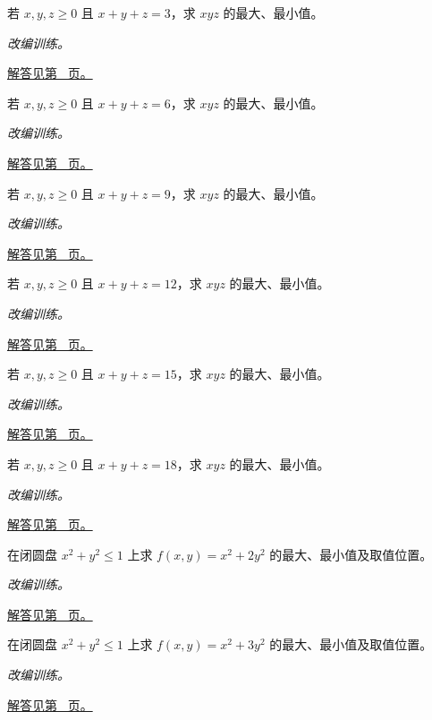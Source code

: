 \documentclass[UTF8,12pt,a4paper,fontset=fandol]{ctexart}
\begin{document}
\begin{example}[正数定和时的三元乘积]\label{ex:c35q7}
若 $x,y,z\ge0$ 且 $x+y+z=3$，求 $xyz$ 的最大、最小值。
\par\textit{改编训练。}\par\hyperref[ans:c35q7]{解答见第~\pageref{ans:c35q7} 页。}
\end{example}
\begin{example}[正数定和时的三元乘积]\label{ex:c35q8}
若 $x,y,z\ge0$ 且 $x+y+z=6$，求 $xyz$ 的最大、最小值。
\par\textit{改编训练。}\par\hyperref[ans:c35q8]{解答见第~\pageref{ans:c35q8} 页。}
\end{example}
\begin{example}[正数定和时的三元乘积]\label{ex:c35q9}
若 $x,y,z\ge0$ 且 $x+y+z=9$，求 $xyz$ 的最大、最小值。
\par\textit{改编训练。}\par\hyperref[ans:c35q9]{解答见第~\pageref{ans:c35q9} 页。}
\end{example}
\begin{example}[正数定和时的三元乘积]\label{ex:c35q10}
若 $x,y,z\ge0$ 且 $x+y+z=12$，求 $xyz$ 的最大、最小值。
\par\textit{改编训练。}\par\hyperref[ans:c35q10]{解答见第~\pageref{ans:c35q10} 页。}
\end{example}
\begin{example}[正数定和时的三元乘积]\label{ex:c35q11}
若 $x,y,z\ge0$ 且 $x+y+z=15$，求 $xyz$ 的最大、最小值。
\par\textit{改编训练。}\par\hyperref[ans:c35q11]{解答见第~\pageref{ans:c35q11} 页。}
\end{example}
\begin{example}[正数定和时的三元乘积]\label{ex:c35q12}
若 $x,y,z\ge0$ 且 $x+y+z=18$，求 $xyz$ 的最大、最小值。
\par\textit{改编训练。}\par\hyperref[ans:c35q12]{解答见第~\pageref{ans:c35q12} 页。}
\end{example}
\begin{example}[圆盘上的二次型]\label{ex:c35q13}
在闭圆盘 $x^2+y^2\le1$ 上求 $f(x,y)=x^2+2y^2$ 的最大、最小值及取值位置。
\par\textit{改编训练。}\par\hyperref[ans:c35q13]{解答见第~\pageref{ans:c35q13} 页。}
\end{example}
\begin{example}[圆盘上的二次型]\label{ex:c35q14}
在闭圆盘 $x^2+y^2\le1$ 上求 $f(x,y)=x^2+3y^2$ 的最大、最小值及取值位置。
\par\textit{改编训练。}\par\hyperref[ans:c35q14]{解答见第~\pageref{ans:c35q14} 页。}
\end{example}
\end{document}
